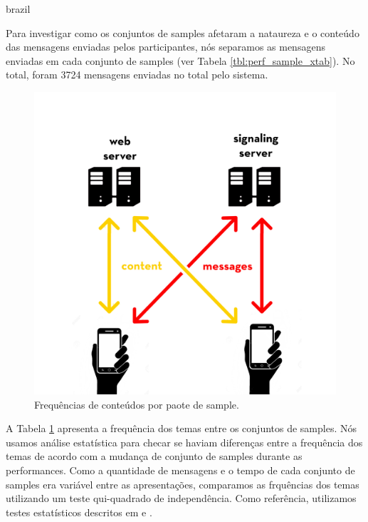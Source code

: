 \begin{otherlanguage*}{brazil}

Para investigar como os conjuntos de samples afetaram a nataureza e o conteúdo das mensagens enviadas pelos participantes, nós separamos as mensagens enviadas em cada conjunto de samples (ver Tabela \ref{tbl:perf_sample_xtab}). No total, foram 3724 mensagens enviadas no total pelo sistema. 



\begin{figure}
\centering
\includegraphics[width=1.1\linewidth]{pictures/server.jpg}
\caption{Frequências de conteúdos por paote de sample.}
\label{subj_themes}
\end{figure}

A Tabela \ref{subj_themes} apresenta a frequência dos temas entre os conjuntos de samples. Nós usamos análise estatística para checar se haviam diferenças entre a frequência dos temas de acordo com a mudança de conjunto de samples durante as performances. Como a quantidade de mensagens e o tempo de cada conjunto de samples era variável entre as apresentações, comparamos as frquências dos temas utilizando um teste qui-quadrado de independência. Como referência, utilizamos testes estatísticos descritos em \cite{beasley1995multiple} e \cite{garcia2003cellwise}. 


\end{otherlanguage*}
